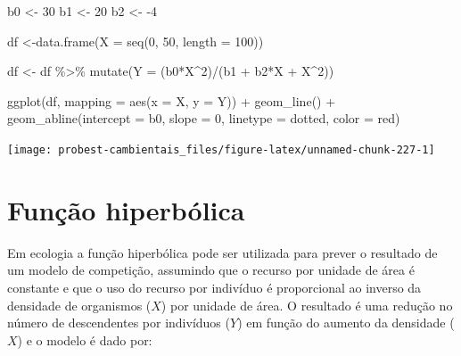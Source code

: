 \documentclass[
]{book}
\newenvironment{Shaded}{\begin{snugshade}}{\end{snugshade}}
\newcommand{\AttributeTok}[1]{\textcolor[rgb]{0.77,0.63,0.00}{#1}}
\newcommand{\DecValTok}[1]{\textcolor[rgb]{0.00,0.00,0.81}{#1}}
\newcommand{\FunctionTok}[1]{\textcolor[rgb]{0.00,0.00,0.00}{#1}}
\newcommand{\NormalTok}[1]{#1}
\newcommand{\OtherTok}[1]{\textcolor[rgb]{0.56,0.35,0.01}{#1}}
\newcommand{\SpecialCharTok}[1]{\textcolor[rgb]{0.00,0.00,0.00}{#1}}
\newcommand{\StringTok}[1]{\textcolor[rgb]{0.31,0.60,0.02}{#1}}
\begin{document}
\begin{Shaded}
\begin{Highlighting}[]
\NormalTok{b0 }\OtherTok{\textless{}{-}} \DecValTok{30}
\NormalTok{b1 }\OtherTok{\textless{}{-}} \DecValTok{20}
\NormalTok{b2 }\OtherTok{\textless{}{-}} \SpecialCharTok{{-}}\DecValTok{4}

\NormalTok{df }\OtherTok{\textless{}{-}}\FunctionTok{data.frame}\NormalTok{(}\AttributeTok{X =} \FunctionTok{seq}\NormalTok{(}\DecValTok{0}\NormalTok{, }\DecValTok{50}\NormalTok{, }\AttributeTok{length =} \DecValTok{100}\NormalTok{))}

\NormalTok{df }\OtherTok{\textless{}{-}}\NormalTok{ df }\SpecialCharTok{\%\textgreater{}\%} \FunctionTok{mutate}\NormalTok{(}\AttributeTok{Y =}\NormalTok{ (b0}\SpecialCharTok{*}\NormalTok{X}\SpecialCharTok{\^{}}\DecValTok{2}\NormalTok{)}\SpecialCharTok{/}\NormalTok{(b1 }\SpecialCharTok{+}\NormalTok{ b2}\SpecialCharTok{*}\NormalTok{X }\SpecialCharTok{+}\NormalTok{ X}\SpecialCharTok{\^{}}\DecValTok{2}\NormalTok{))}

\FunctionTok{ggplot}\NormalTok{(df, }\AttributeTok{mapping =} \FunctionTok{aes}\NormalTok{(}\AttributeTok{x =}\NormalTok{ X, }\AttributeTok{y =}\NormalTok{ Y)) }\SpecialCharTok{+}
  \FunctionTok{geom\_line}\NormalTok{() }\SpecialCharTok{+}
  \FunctionTok{geom\_abline}\NormalTok{(}\AttributeTok{intercept =}\NormalTok{ b0, }\AttributeTok{slope =} \DecValTok{0}\NormalTok{, }\AttributeTok{linetype =} \StringTok{\textquotesingle{}dotted\textquotesingle{}}\NormalTok{, }\AttributeTok{color =} \StringTok{\textquotesingle{}red\textquotesingle{}}\NormalTok{)}
\end{Highlighting}
\end{Shaded}

\begin{center}\texttt{[image: probest-cambientais\_files/figure-latex/unnamed-chunk-227-1]} \end{center}

\hypertarget{funuxe7uxe3o-hiperbuxf3lica}{%
\section{Função hiperbólica}\label{funuxe7uxe3o-hiperbuxf3lica}}

Em ecologia a função hiperbólica pode ser utilizada para prever o resultado de um modelo de competição, assumindo que o recurso por unidade de área é constante e que o uso do recurso por indivíduo é proporcional ao inverso da densidade de organismos (\(X\)) por unidade de área. O resultado é uma redução no número de descendentes por indivíduos (\(Y\)) em função do aumento da densidade (\(X\)) e o modelo é dado por:
\end{document}
